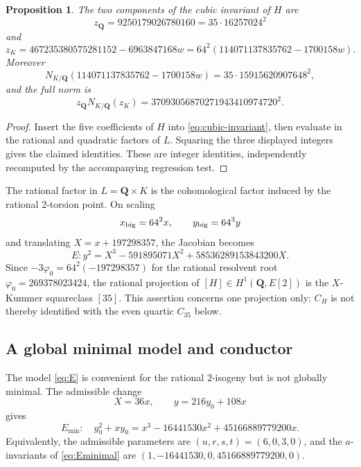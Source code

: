 \documentclass[11pt]{article}
\newtheorem{proposition}[theorem]{Proposition}
\newcommand{\Q}{\mathbf Q}
\begin{document}
\begin{proposition}\label{prop:z}
The two components of the cubic invariant of $H$ are
\[
 z_{\Q}=9250179026780160=35\cdot16257024^2
\]
and
\[
 z_K=467235380575281152-6963847168w
     =64^2(114071137835762-1700158w).
\]
Moreover
\[
 N_{K/\Q}(114071137835762-1700158w)
   =35\cdot15915620907648^2,
\]
and the full norm is
\[
 z_{\Q}N_{K/\Q}(z_K)
  =37093056870271943410974720^2.
\]
\end{proposition}
\begin{proof}
Insert the five coefficients of $H$ into \eqref{eq:cubic-invariant}, then
evaluate in the rational and quadratic factors of $L$.  Squaring the three
displayed integers gives the claimed identities.  These are integer
identities, independently recomputed by the accompanying regression test.
\end{proof}

The rational factor in $L=\Q\times K$ is the cohomological factor induced by
the rational $2$-torsion point.  On scaling
\[
 x_{\rm big}=64^2x,\qquad y_{\rm big}=64^3y
\]
and translating $X=x+197298357$, the Jacobian becomes
\begin{equation}\label{eq:E}
 E:y^2=X^3-591895071X^2+58536289153843200X.
\end{equation}
Since $-3\varphi_0=64^2(-197298357)$ for the rational resolvent root
$\varphi_0=269378023424$, the rational projection of $[H]\in
H^1(\Q,E[2])$ is the $X$-Kummer squareclass $[35]$.  This assertion concerns
one projection only: $C_H$ is not thereby identified with the even quartic
$C_{35}$ below.

\subsection{A global minimal model and conductor}

The model \eqref{eq:E} is convenient for the rational $2$-isogeny but is
not globally minimal.  The admissible change
\begin{equation}\label{eq:minimal-change}
 X=36x,\qquad y=216y_0+108x
\end{equation}
gives
\begin{equation}\label{eq:Eminimal}
 E_{\min}:\quad y_0^2+xy_0
 =x^3-16441530x^2+45166889779200x.
\end{equation}
Equivalently, the admissible parameters are $(u,r,s,t)=(6,0,3,0)$, and the
$a$-invariants of \eqref{eq:Eminimal} are
$(1,-16441530,0,45166889779200,0)$.
\end{document}
